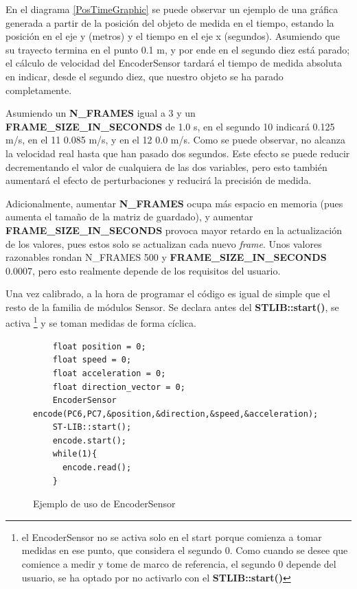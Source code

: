 \documentclass{report}
\begin{document}
\par \vspace{0.3cm}
En el diagrama \ref{PosTimeGraphic} se puede observar un ejemplo de una gráfica generada a partir de la posición del objeto de medida en el tiempo, estando la posición en el eje y (metros) y el tiempo en el eje x (segundos). Asumiendo que su trayecto termina en el punto 0.1 m, y por ende en el segundo diez está parado; el cálculo de velocidad del EncoderSensor tardará el tiempo de medida absoluta en indicar, desde el segundo diez, que nuestro objeto se ha parado completamente. \par
Asumiendo un \textbf{N\_FRAMES} igual a 3 y un \textbf{FRAME\_SIZE\_IN\_SECONDS} de 1.0 s, en el segundo 10 indicará 0.125 m/s, en el 11 0.085 m/s, y en el 12 0.0 m/s. Como se puede observar, no alcanza la velocidad real hasta que han pasado dos segundos. Este efecto se puede reducir decrementando el valor de cualquiera de las dos variables, pero esto también aumentará el efecto de perturbaciones y reducirá la precisión de medida. \par
Adicionalmente, aumentar \textbf{N\_FRAMES} ocupa más espacio en memoria (pues aumenta el tamaño de la matriz de guardado), y aumentar \textbf{FRAME\_SIZE\_IN\_SECONDS} provoca mayor retardo en la actualización de los valores, pues estos solo se actualizan cada nuevo \textit{frame}. Unos valores razonables rondan N\_FRAMES 500 y \textbf{FRAME\_SIZE\_IN\_SECONDS} 0.0007, pero esto realmente depende de los requisitos del usuario. 
\par \vspace{0.3cm}
Una vez calibrado, a la hora de programar el código es igual de simple que el resto de la familia de módulos Sensor. Se declara antes del \textbf{STLIB::start()}, se activa \footnote{el EncoderSensor no se activa solo en el start porque comienza a tomar medidas en ese punto, que considera el segundo 0. Como cuando se desee que comience a medir y tome de marco de referencia, el segundo 0 depende del usuario, se ha optado por no activarlo con el \textbf{STLIB::start()}} y se toman medidas de forma cíclica. 
\begin{figure}[h]
  \begin{lstlisting}
    float position = 0;
    float speed = 0;
    float acceleration = 0;
    float direction_vector = 0;
    EncoderSensor encode(PC6,PC7,&position,&direction,&speed,&acceleration);
    ST-LIB::start();
    encode.start();
    while(1){
      encode.read();
    }
  \end{lstlisting}
  \caption{Ejemplo de uso de EncoderSensor}
  \label{EncoderSensorCode}
\end{figure}
\end{document}
